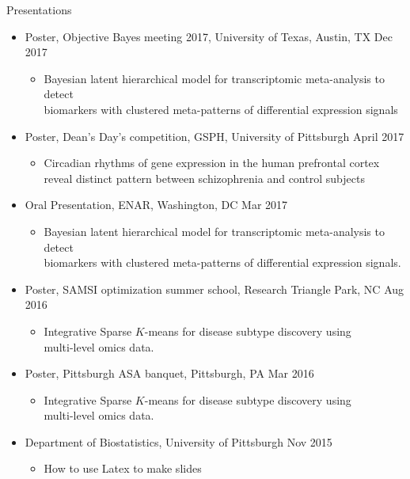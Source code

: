 \documentclass{resume} %
\begin{document}
\begin{rSection}{Presentations}
\begin{itemize}[noitemsep,topsep=0pt]
\item  Poster, Objective Bayes meeting 2017, University of Texas, Austin, TX \hfill {Dec 2017}
\begin{itemize}[noitemsep,topsep=0pt]
\item{Bayesian latent hierarchical model for transcriptomic meta-analysis to detect\\ biomarkers with clustered meta-patterns of differential expression signals}
\end{itemize}

\item  Poster, Dean's Day's competition, GSPH, University of Pittsburgh \hfill {April 2017}
\begin{itemize}[noitemsep,topsep=0pt]
\item{Circadian rhythms of gene expression in the human prefrontal cortex \\reveal distinct pattern between schizophrenia and control subjects}
\end{itemize}

\item Oral Presentation, ENAR, Washington, DC \hfill {Mar 2017}
\begin{itemize}[noitemsep,topsep=0pt]
\item{Bayesian latent hierarchical model for transcriptomic meta-analysis to detect\\ biomarkers with clustered meta-patterns of differential expression signals.}
\end{itemize}




\item Poster, SAMSI optimization summer school,  Research Triangle Park, NC  \hfill {Aug 2016}
\begin{itemize}[noitemsep,topsep=0pt]
\item{Integrative Sparse $K$-means for disease subtype discovery using \\multi-level omics data.}
\end{itemize}

\item Poster, Pittsburgh ASA banquet, Pittsburgh, PA \hfill {Mar 2016}
\begin{itemize}[noitemsep,topsep=0pt]
\item{Integrative Sparse $K$-means for disease subtype discovery using \\multi-level omics data.}
\end{itemize}

\item Department of Biostatistics, University of Pittsburgh  \hfill Nov 2015
\begin{itemize}[noitemsep,topsep=0pt]
\item{How to use Latex to make slides}
\end{itemize}


\end{itemize}
\end{rSection}
\end{document}
